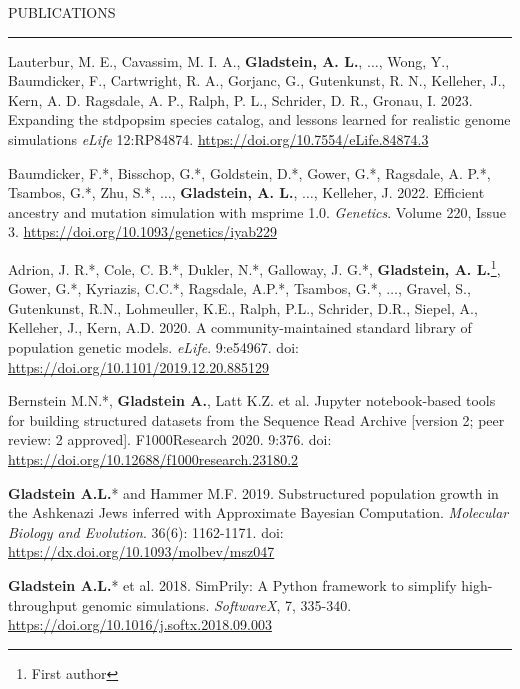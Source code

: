 \documentclass{resume} %
\renewenvironment{rSection}[1]{
\sectionskip
\textcolor{RoyalPurple}{\MakeUppercase{#1}}
\sectionlineskip
\hrule
\begin{list}{}{
\setlength{\leftmargin}{1.5em}
}
\item[]
}{
\end{list}
}
\begin{document}

\begin{rSection}{Publications}

\item Lauterbur, M. E., Cavassim, M. I. A., \textbf{Gladstein, A. L.}, $\ldots$, Wong, Y., Baumdicker, F., Cartwright, R. A., Gorjanc, G., Gutenkunst, R. N., Kelleher, J., Kern, A. D. Ragsdale, A. P., Ralph, P. L., Schrider, D. R., Gronau, I. 2023. Expanding the stdpopsim species catalog, and lessons learned for realistic genome simulations \textit{eLife} 12:RP84874. \url{https://doi.org/10.7554/eLife.84874.3}

\item Baumdicker, F.*, Bisschop, G.*, Goldstein, D.*, Gower, G.*, Ragsdale, A. P.*, Tsambos, G.*, Zhu, S.*, $\ldots$, \textbf{Gladstein, A. L.}, $\ldots$, Kelleher, J. 2022. Efficient ancestry and mutation simulation with msprime 1.0. \textit{Genetics}. Volume 220, Issue 3. \url{https://doi.org/10.1093/genetics/iyab229}

\item Adrion, J. R.*, Cole, C. B.*, Dukler, N.*, Galloway, J. G.*, \textbf{Gladstein, A. L.}\footnote{First author}, Gower, G.*, Kyriazis, C.C.*, Ragsdale, A.P.*, Tsambos, G.*, $\ldots$, Gravel, S., Gutenkunst, R.N., Lohmeuller, K.E., Ralph, P.L., Schrider, D.R., Siepel, A., Kelleher, J., Kern, A.D. 2020. A community-maintained standard library of population genetic models. \textit{eLife}. 9:e54967. doi: \url{https://doi.org/10.1101/2019.12.20.885129}

\item Bernstein M.N.*, \textbf{Gladstein A.}, Latt K.Z. et al. Jupyter notebook-based tools for building structured datasets from the Sequence Read Archive [version 2; peer review: 2 approved]. F1000Research 2020. 9:376. doi: \url{https://doi.org/10.12688/f1000research.23180.2}

\item \textbf{Gladstein A.L.}* and Hammer M.F. 2019. Substructured population growth in the Ashkenazi Jews inferred with Approximate Bayesian Computation. \textit{Molecular Biology and Evolution}. 36(6): 1162-1171. doi: \url{https://dx.doi.org/10.1093/molbev/msz047}

\item \textbf{Gladstein A.L.}* et al. 2018. SimPrily: A Python framework to simplify high-throughput genomic simulations. \textit{SoftwareX}, 7, 335-340. \url{https://doi.org/10.1016/j.softx.2018.09.003}


\end{rSection}
\end{document}

